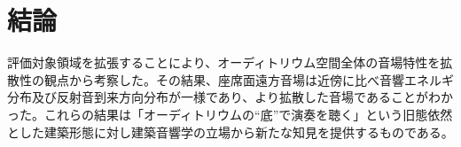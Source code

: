 \chapter{結論}
評価対象領域を拡張することにより、オーディトリウム空間全体の音場特性を拡散性の観点から考察した。その結果、座席面遠方音場は近傍に比べ音響エネルギ分布及び反射音到来方向分布が一様であり、より拡散した音場であることがわかった。これらの結果は「オーディトリウムの“底”で演奏を聴く」という旧態依然とした建築形態に対し建築音響学の立場から新たな知見を提供するものである。